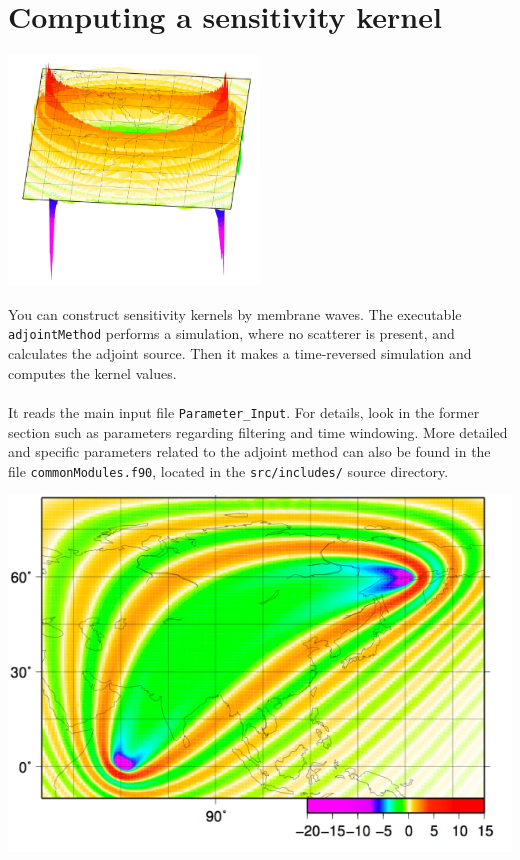 \documentclass[a4paper,
                          headsepline,
                          listof=totoc,
                          toc=listof,
                          headings=small]{scrreprt} %
\begin{document}
\chapter{Computing a sensitivity kernel}
\begin{flushright}
\includegraphics[width=0.5\textwidth]{figures/adjointkernel-L150-3D.jpg}
\end{flushright}

You can construct sensitivity kernels by membrane waves.
The executable \texttt{adjointMethod} performs a simulation, where no scatterer is present,
and calculates the adjoint source.
Then it makes a time-reversed simulation and computes the kernel values.
\\
\\
It reads the main input file \texttt{Parameter\_Input}. For details, look in the former
section such as parameters regarding filtering and time windowing.
More detailed and specific parameters related to the adjoint method can also be found
in the file \texttt{commonModules.f90}, located in the \texttt{src/includes/} source directory.

\vspace{2cm}
\begin{center}
\includegraphics[width=1.0\textwidth]{figures/tibet-adjointHet40.jpg}
\end{center}
\end{document}
